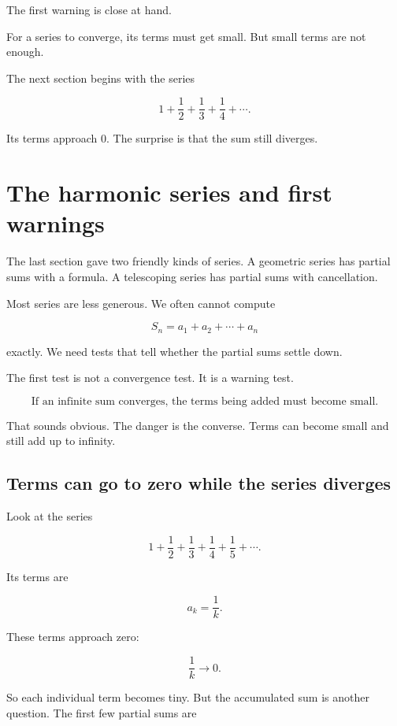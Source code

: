The first warning is close at hand.

For a series to converge, its terms must get small.  But small terms are not enough.

The next section begins with the series

\[
1+\frac12+\frac13+\frac14+\cdots.
\]

Its terms approach \(0\).  The surprise is that the sum still diverges.


\section{The harmonic series and first warnings}
\label{sec:harmonic-series-first-warnings}

The last section gave two friendly kinds of series.  A geometric series has partial sums
with a formula.  A telescoping series has partial sums with cancellation.

Most series are less generous.  We often cannot compute

\[
S_n=a_1+a_2+\cdots+a_n
\]

exactly.  We need tests that tell whether the partial sums settle down.

The first test is not a convergence test.  It is a warning test.

\[
\boxed{
\text{If an infinite sum converges, the terms being added must become small.}
}
\]

That sounds obvious.  The danger is the converse.  Terms can become small and still add
up to infinity.

\subsection{Terms can go to zero while the series diverges}
\label{subsec:terms-zero-series-diverges}

Look at the series

\[
1+\frac12+\frac13+\frac14+\frac15+\cdots.
\]

Its terms are

\[
a_k=\frac1k.
\]

These terms approach zero:

\[
\frac1k\to0.
\]

So each individual term becomes tiny.  But the accumulated sum is another question.
The first few partial sums are

